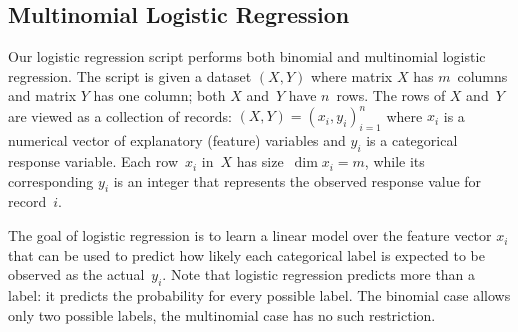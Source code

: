 \begin{comment}

 Licensed to the Apache Software Foundation (ASF) under one
 or more contributor license agreements.  See the NOTICE file
 distributed with this work for additional information
 regarding copyright ownership.  The ASF licenses this file
 to you under the Apache License, Version 2.0 (the
 "License"); you may not use this file except in compliance
 with the License.  You may obtain a copy of the License at

   http://www.apache.org/licenses/LICENSE-2.0

 Unless required by applicable law or agreed to in writing,
 software distributed under the License is distributed on an
 "AS IS" BASIS, WITHOUT WARRANTIES OR CONDITIONS OF ANY
 KIND, either express or implied.  See the License for the
 specific language governing permissions and limitations
 under the License.

\end{comment}

\subsection{Multinomial Logistic Regression}

\smallskip

Our logistic regression script performs both binomial and multinomial logistic regression.
The script is given a dataset $(X, Y)$ where matrix $X$ has $m$~columns and matrix $Y$ has
one column; both $X$ and~$Y$ have $n$~rows.  The rows of $X$ and~$Y$ are viewed as a collection
of records: $(X, Y) = (x_i, y_i)_{i=1}^n$ where $x_i$ is a numerical vector of explanatory
(feature) variables and $y_i$ is a categorical response variable.
Each row~$x_i$ in~$X$ has size~\mbox{$\dim x_i = m$}, while its corresponding $y_i$ is an
integer that represents the observed response value for record~$i$.

The goal of logistic regression is to learn a linear model over the feature vector
$x_i$ that can be used to predict how likely each categorical label is expected to
be observed as the actual~$y_i$.
Note that logistic regression predicts more than a label: it predicts the probability
for every possible label.  The binomial case allows only two possible labels, the
multinomial case has no such restriction.

